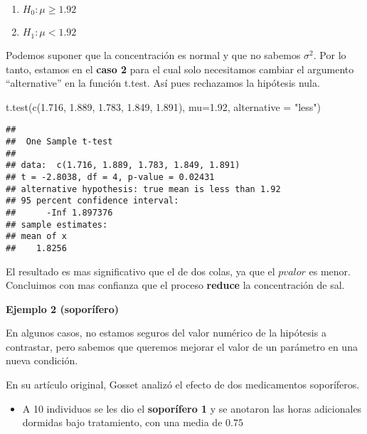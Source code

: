 \documentclass[
]{book}
\newenvironment{Shaded}{\begin{snugshade}}{\end{snugshade}}
\newcommand{\AttributeTok}[1]{\textcolor[rgb]{0.77,0.63,0.00}{#1}}
\newcommand{\FloatTok}[1]{\textcolor[rgb]{0.00,0.00,0.81}{#1}}
\newcommand{\FunctionTok}[1]{\textcolor[rgb]{0.00,0.00,0.00}{#1}}
\newcommand{\NormalTok}[1]{#1}
\newcommand{\StringTok}[1]{\textcolor[rgb]{0.31,0.60,0.02}{#1}}
\providecommand{\tightlist}{%
  \setlength{\itemsep}{0pt}\setlength{\parskip}{0pt}}
\begin{document}
\begin{enumerate}
\def\labelenumi{\alph{enumi}.}
\tightlist
\item
  \(H_0:\mu\geq 1.92\)
\item
  \(H_1:\mu < 1.92\)
\end{enumerate}

Podemos suponer que la concentración es normal y que no sabemos \(\sigma^2\). Por lo tanto, estamos en el \textbf{caso 2} para el cual solo necesitamos cambiar el argumento ``alternative'' en la función t.test. Así pues rechazamos la hipótesis nula.

\begin{Shaded}
\begin{Highlighting}[]
\FunctionTok{t.test}\NormalTok{(}\FunctionTok{c}\NormalTok{(}\FloatTok{1.716}\NormalTok{, }\FloatTok{1.889}\NormalTok{, }\FloatTok{1.783}\NormalTok{, }\FloatTok{1.849}\NormalTok{, }\FloatTok{1.891}\NormalTok{), }
       \AttributeTok{mu=}\FloatTok{1.92}\NormalTok{, }\AttributeTok{alternative =} \StringTok{"less"}\NormalTok{)}
\end{Highlighting}
\end{Shaded}

\begin{verbatim}
## 
##  One Sample t-test
## 
## data:  c(1.716, 1.889, 1.783, 1.849, 1.891)
## t = -2.8038, df = 4, p-value = 0.02431
## alternative hypothesis: true mean is less than 1.92
## 95 percent confidence interval:
##      -Inf 1.897376
## sample estimates:
## mean of x 
##    1.8256
\end{verbatim}

El resultado es mas significativo que el de dos colas, ya que el \(pvalor\) es menor. Concluimos con mas confianza que el proceso \textbf{reduce} la concentración de sal.

\textbf{Ejemplo 2 (soporífero)}

En algunos casos, no estamos seguros del valor numérico de la hipótesis a contrastar, pero sabemos que queremos mejorar el valor de un parámetro en una nueva condición.

En su artículo original, Gosset analizó el efecto de dos medicamentos soporíferos.

\begin{itemize}
\tightlist
\item
  A 10 individuos se les dio el \textbf{soporífero 1} y se anotaron las horas adicionales dormidas bajo tratamiento, con una media de \(0.75\)
\end{itemize}
\end{document}
